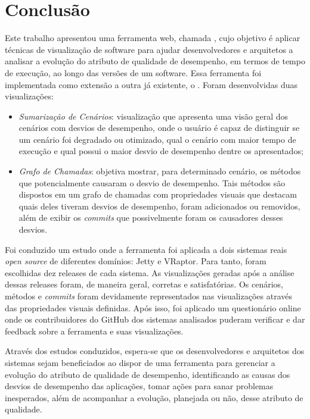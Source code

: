 \chapter{Conclusão} \label{ch:conclusao}

Este trabalho apresentou uma ferramenta web, chamada \textit{\toolName}, cujo objetivo é aplicar técnicas de visualização de software para ajudar desenvolvedores e arquitetos a analisar a evolução do atributo de qualidade de desempenho, em termos de tempo de execução, ao longo das versões de um software. Essa ferramenta foi implementada como extensão a outra já existente, o \textit{\perfMinerName}. Foram desenvolvidas duas visualizações:
\begin{itemize}
	\item \textit{Sumarização de Cenários}: visualização que apresenta uma visão geral dos cenários com desvios de desempenho, onde o usuário é capaz de distinguir se um cenário foi degradado ou otimizado, qual o cenário com maior tempo de execução e qual possui o maior desvio de desempenho dentre os apresentados;
	\item \textit{Grafo de Chamadas}: objetiva mostrar, para determinado cenário, os métodos que potencialmente causaram o desvio de desempenho. Tais métodos são dispostos em um grafo de chamadas com propriedades visuais que destacam quais deles tiveram desvios de desempenho, foram adicionados ou removidos, além de exibir os \textit{commits} que possivelmente foram os causadores desses desvios.
\end{itemize}

Foi conduzido um estudo onde a ferramenta foi aplicada a dois sistemas reais \textit{open source} de diferentes domínios: Jetty e VRaptor. Para tanto, foram escolhidas dez releases de cada sistema. As visualizações geradas após a análise dessas releases foram, de maneira geral, corretas e satisfatórias. Os cenários, métodos e \textit{commits} foram devidamente representados nas visualizações através das propriedades visuais definidas. Após isso, foi aplicado um questionário online onde os contribuidores do GitHub dos sistemas analisados puderam verificar e dar feedback sobre a ferramenta e suas visualizações.

Através dos estudos conduzidos, espera-se que os desenvolvedores e arquitetos dos sistemas sejam beneficiados ao dispor de uma ferramenta para gerenciar a evolução do atributo de qualidade de desempenho, identificando as causas dos desvios de desempenho das aplicações, tomar ações para sanar problemas inesperados, além de acompanhar a evolução, planejada ou não, desse atributo de qualidade.


